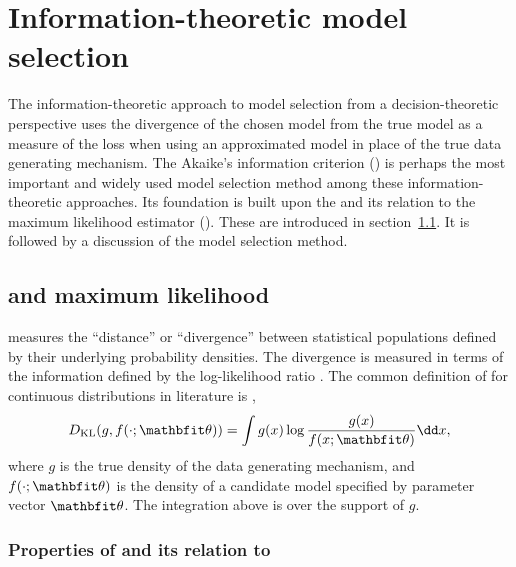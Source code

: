 \chapter{Information-theoretic model selection}
\label{cha:Information-theoretic model selection}

The information-theoretic approach to model selection from a
decision-theoretic perspective uses the divergence of the chosen model from
the true model as a measure of the loss when using an approximated model in
place of the true data generating mechanism. The Akaike's information
criterion (\aic) is perhaps the most important and widely used model selection
method among these information-theoretic approaches. Its foundation is built
upon the \kl and its relation to the maximum likelihood estimator (\mle).
These are introduced in section~\ref{sec:kl and maximum likelihood}. It is
followed by a discussion of the \aic model selection method.

\section{\kl and maximum likelihood}
\label{sec:kl and maximum likelihood}

\kl measures the ``distance'' or ``divergence'' between statistical
populations defined by their underlying probability densities. The divergence
is measured in terms of the information defined by the log-likelihood ratio
\parencite{Kullback1951}. The common definition of \kl for continuous
distributions in literature is \parencite[e.g.,][]{Claeskens2008},
\begin{equation}
  \dkl(g, f(\cdot;\bth)) = \int g(x)\log\frac{g(x)}{f(x;\bth)}\dd x,
  \label{eq:kld}
\end{equation}
where $g$ is the true density of the data generating mechanism, and
$f(\cdot;\bth)$ is the density of a candidate model specified by parameter
vector $\bth$. The integration above is over the support of $g$.

\subsection{Properties of \kl and its relation to \protect\mle}
\label{sub:Properties of kl and its relation to mle}

